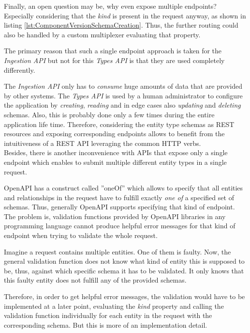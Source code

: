 Finally, an open question may be, why even expose multiple endpoints? Especially considering that the \emph{kind} is present in the request anyway, as shown in listing \ref{lst:ComponentVersionSchemaCreation}. Thus, the further routing could also be handled by a custom multiplexer evaluating that property.\par
The primary reason that such a single endpoint approach is taken for the \emph{Ingestion API} but not for this \emph{Types API} is that they are used completely differently.\par
The \emph{Ingestion API} only has to \emph{consume} huge amounts of data that are provided by other systems. The \emph{Types API} is used by a human administrator to configure the application by \emph{creating}, \emph{reading} and in edge cases also \emph{updating} and \emph{deleting} schemas. Also, this is probably done only a few times during the entire application life time. Therefore, considering the entity type schemas as REST resources and exposing corresponding endpoints allows to benefit from the intuitiveness of a REST API leveraging the common HTTP verbs.\\

Besides, there is another inconvenience with APIs that expose only a single endpoint which enables to submit multiple different entity types in a single request.\par 
OpenAPI has a construct called ''oneOf'' which allows to specify that all entities and relationships in the request have to fulfill exactly \emph{one of} a specified set of schemas. Thus, generally OpenAPI supports specifying that kind of endpoint. The problem is, validation functions provided by OpenAPI libraries in any programming language cannot produce helpful error messages for that kind of endpoint when trying to validate the whole request.\par 
Imagine a request contains multiple entities. One of them is faulty. Now, the general validation function does not know what kind of entity this is supposed to be, thus, against which specific schema it has to be validated. It only knows that this faulty entity does not fulfill any of the provided schemas.\par
Therefore, in order to get helpful error messages, the validation would have to be implemented at a later point, evaluating the \emph{kind} property and calling the validation function individually for each entity in the request with the corresponding schema. But this is more of an implementation detail.

